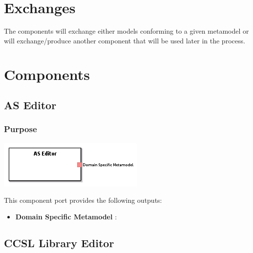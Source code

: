 \documentclass{gemoc} %
\begin{document}
\section{Exchanges}
The components will exchange either models conforming to a given metamodel or will exchange/produce another component that will be used later in the process.


\section{Components}


\subsection{AS Editor}


\subsubsection{Purpose}


\begin{center}
\includegraphics*[trim=0.0cm 0.0cm 0cm 0.0cm, clip=true]{../images/generated/Generated_AS_Editor.png}
\end{center}


This component port provides the following outputs:
\begin{itemize}
  \item \textbf{Domain Specific Metamodel} :
\end{itemize}


\subsection{CCSL Library Editor}
\end{document}
